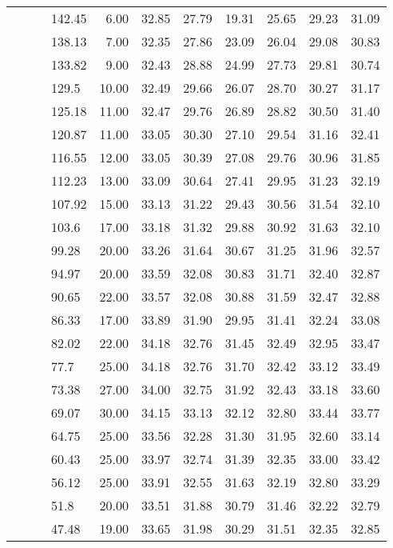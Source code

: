 \begin{longtable}{llllrrrrrrr}
   &  &  & 142.45 & 6.00 & 32.85 & 27.79 & 19.31 & 25.65 & 29.23 & 31.09 \\ 
   &  &  & 138.13 & 7.00 & 32.35 & 27.86 & 23.09 & 26.04 & 29.08 & 30.83 \\ 
   &  &  & 133.82 & 9.00 & 32.43 & 28.88 & 24.99 & 27.73 & 29.81 & 30.74 \\ 
   &  &  & 129.5 & 10.00 & 32.49 & 29.66 & 26.07 & 28.70 & 30.27 & 31.17 \\ 
   &  &  & 125.18 & 11.00 & 32.47 & 29.76 & 26.89 & 28.82 & 30.50 & 31.40 \\ 
   &  &  & 120.87 & 11.00 & 33.05 & 30.30 & 27.10 & 29.54 & 31.16 & 32.41 \\ 
   &  &  & 116.55 & 12.00 & 33.05 & 30.39 & 27.08 & 29.76 & 30.96 & 31.85 \\ 
   &  &  & 112.23 & 13.00 & 33.09 & 30.64 & 27.41 & 29.95 & 31.23 & 32.19 \\ 
   &  &  & 107.92 & 15.00 & 33.13 & 31.22 & 29.43 & 30.56 & 31.54 & 32.10 \\ 
   &  &  & 103.6 & 17.00 & 33.18 & 31.32 & 29.88 & 30.92 & 31.63 & 32.10 \\ 
   &  &  & 99.28 & 20.00 & 33.26 & 31.64 & 30.67 & 31.25 & 31.96 & 32.57 \\ 
   &  &  & 94.97 & 20.00 & 33.59 & 32.08 & 30.83 & 31.71 & 32.40 & 32.87 \\ 
   &  &  & 90.65 & 22.00 & 33.57 & 32.08 & 30.88 & 31.59 & 32.47 & 32.88 \\ 
   &  &  & 86.33 & 17.00 & 33.89 & 31.90 & 29.95 & 31.41 & 32.24 & 33.08 \\ 
   &  &  & 82.02 & 22.00 & 34.18 & 32.76 & 31.45 & 32.49 & 32.95 & 33.47 \\ 
   &  &  & 77.7 & 25.00 & 34.18 & 32.76 & 31.70 & 32.42 & 33.12 & 33.49 \\ 
   &  &  & 73.38 & 27.00 & 34.00 & 32.75 & 31.92 & 32.43 & 33.18 & 33.60 \\ 
   &  &  & 69.07 & 30.00 & 34.15 & 33.13 & 32.12 & 32.80 & 33.44 & 33.77 \\ 
   &  &  & 64.75 & 25.00 & 33.56 & 32.28 & 31.30 & 31.95 & 32.60 & 33.14 \\ 
   &  &  & 60.43 & 25.00 & 33.97 & 32.74 & 31.39 & 32.35 & 33.00 & 33.42 \\ 
   &  &  & 56.12 & 25.00 & 33.91 & 32.55 & 31.63 & 32.19 & 32.80 & 33.29 \\ 
   &  &  & 51.8 & 20.00 & 33.51 & 31.88 & 30.79 & 31.46 & 32.22 & 32.79 \\ 
   &  &  & 47.48 & 19.00 & 33.65 & 31.98 & 30.29 & 31.51 & 32.35 & 32.85 \\ 

\end{longtable}
